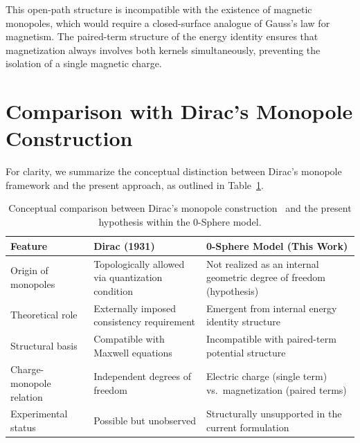 \documentclass[12pt,letterpaper]{article}
\begin{document}
This open-path structure is incompatible with the existence of magnetic monopoles, which would require a closed-surface analogue of Gauss's law for magnetism. The paired-term structure of the energy identity ensures that magnetization always involves both kernels simultaneously, preventing the isolation of a single magnetic charge.

\section{Comparison with Dirac's Monopole Construction}

For clarity, we summarize the conceptual distinction between Dirac's monopole framework and the present approach, as outlined in Table~\ref{tab:dirac_comparison}.

\begin{table}[t!]
\centering
\renewcommand{\arraystretch}{1.3}
\begin{tabularx}{\textwidth}{l X X}
\toprule
\textbf{Feature} & \textbf{Dirac (1931)~\cite{Dirac1931}} & \textbf{0-Sphere Model (This Work)} \\
\midrule
Origin of monopoles & Topologically allowed via quantization condition & Not realized as an internal geometric degree of freedom (hypothesis) \\
Theoretical role & Externally imposed consistency requirement & Emergent from internal energy identity structure \\
Structural basis & Compatible with Maxwell equations & Incompatible with paired-term potential structure \\
Charge-monopole relation & Independent degrees of freedom & Electric charge (single term) vs.\ magnetization (paired terms) \\
Experimental status & Possible but unobserved & Structurally unsupported in the current formulation \\
\bottomrule
\end{tabularx}
\caption{Conceptual comparison between Dirac's monopole construction~\cite{Dirac1931} and the present hypothesis within the 0-Sphere model.}
\label{tab:dirac_comparison}
\end{table}
\end{document}
